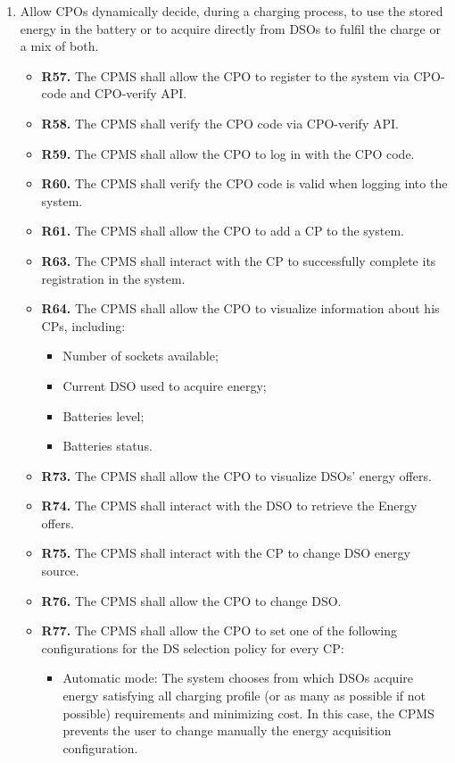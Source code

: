 \documentclass{Configuration_Files/PoliMi3i_thesis}
\begin{document}
\begin{enumerate}[label=\textbf{G\arabic*}]
    \item Allow CPOs dynamically decide, during a charging process, to use the stored energy in the battery or to acquire directly from DSOs to fulfil the charge or a mix of both.
        \begin{itemize}
            \item \textbf{R57.} The CPMS shall allow the CPO to register to the system via CPO-code and CPO-verify API.
            \item \textbf{R58.} The CPMS shall verify the CPO code via CPO-verify API.
            \item \textbf{R59.} The CPMS shall allow the CPO to log in with the CPO code.
            \item \textbf{R60.} The CPMS shall verify the CPO code is valid when logging into the system.
            \item \textbf{R61.} The CPMS shall allow the CPO to add a CP to the system.
            \item \textbf{R63.} The CPMS shall interact with the CP to successfully complete its registration in the system.
            \item \textbf{R64.} The CPMS shall allow the CPO to visualize information about his CPs, including:
                \begin{itemize}
                    \item Number of sockets available;
                    \item Current DSO used to acquire energy;
                    \item Batteries level;
                    \item Batteries status.
                \end{itemize}
            \item \textbf{R73.} The CPMS shall allow the CPO to visualize DSOs' energy offers.
            \item \textbf{R74.} The CPMS shall interact with the DSO to retrieve the Energy offers.
            \item \textbf{R75.} The CPMS shall interact with the CP to change DSO energy source.
            \item \textbf{R76.} The CPMS shall allow the CPO to change DSO.
            \item \textbf{R77.} The CPMS shall allow the CPO to set one of the following configurations for the DS selection policy for every CP:
                \begin{itemize}
                    \item Automatic mode: The system chooses from which DSOs acquire energy satisfying all charging profile (or as many as possible if not possible) requirements and minimizing cost. In this case, the CPMS prevents the user to change manually the energy acquisition configuration.

\end{itemize}
\end{itemize}
\end{enumerate}
\end{document}
